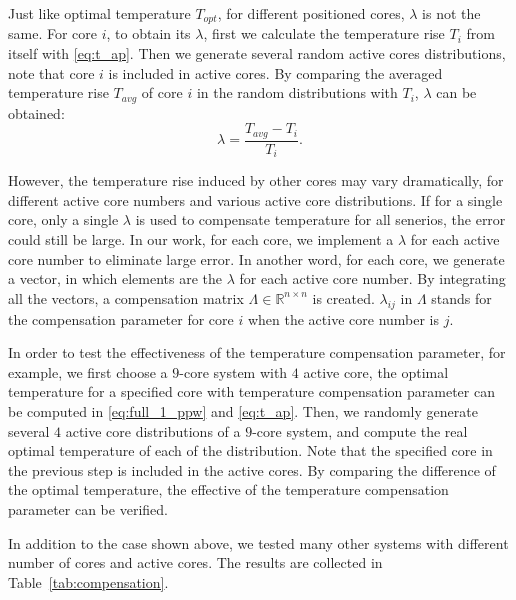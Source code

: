 Just like optimal temperature $T_{opt}$, for different positioned cores, $\lambda$ is not the same. For core $i$, to obtain its $\lambda$, first we calculate the temperature rise $T_{i}$ from itself with \eqref{eq:t_ap}. Then we generate several random active cores distributions, note that core $i$ is included in active cores. By comparing the averaged temperature rise $T_{avg}$ of core $i$ in the random distributions with $T_{i}$, $\lambda$ can be obtained:
\begin{equation}\label{eq:lambda}
\lambda = \frac{T_{avg}-T_{i}}{T_{i}}.
\end{equation}

However, the temperature rise induced by other cores may vary dramatically, for different active core numbers and various active core distributions. If for a single core, only a single $\lambda$ is used to compensate temperature for all senerios, the error could still be large. In our work, for each core, we implement a $\lambda$ for each active core number to eliminate large error. In another word, for each core, we generate a vector, in which elements are the $\lambda$ for each active core number. By integrating all the vectors, a compensation matrix $\Lambda \in \mathbb{R}^{n \times n}$ is created. $\lambda_{ij}$ in $\Lambda$ stands for the compensation parameter for core $i$ when the active core number is $j$.

In order to test the effectiveness of the temperature compensation parameter, for example, we first choose a $9$-core system with $4$ active core, the optimal temperature for a specified core with temperature compensation parameter can be computed in \eqref{eq:full_1_ppw} and \eqref{eq:t_ap}. Then, we randomly generate several $4$ active core distributions of a $9$-core system, and compute the real optimal temperature of each of the distribution. Note that the specified core in the previous step is included in the active cores. By comparing the difference of the optimal temperature, the effective of the temperature compensation parameter can be verified.

In addition to the case shown above, we tested many other systems with different number of cores and active cores. The results are collected in Table~\ref{tab:compensation}.

